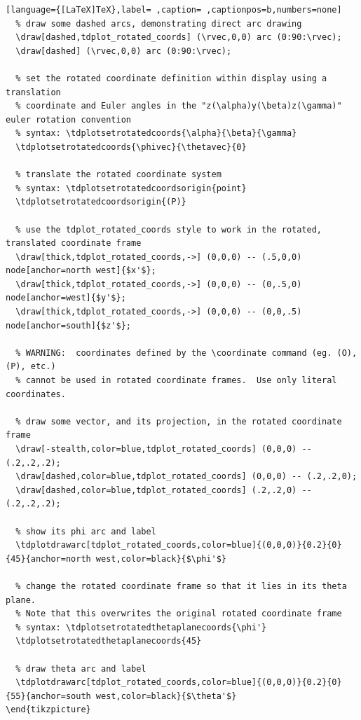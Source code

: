 \documentclass[a4paper,12pt]{article}
\begin{document}
\begin{lstlisting}[language={[LaTeX]TeX},label= ,caption= ,captionpos=b,numbers=none]
  % draw some dashed arcs, demonstrating direct arc drawing
  \draw[dashed,tdplot_rotated_coords] (\rvec,0,0) arc (0:90:\rvec);
  \draw[dashed] (\rvec,0,0) arc (0:90:\rvec);

  % set the rotated coordinate definition within display using a translation
  % coordinate and Euler angles in the "z(\alpha)y(\beta)z(\gamma)" euler rotation convention
  % syntax: \tdplotsetrotatedcoords{\alpha}{\beta}{\gamma}
  \tdplotsetrotatedcoords{\phivec}{\thetavec}{0}

  % translate the rotated coordinate system
  % syntax: \tdplotsetrotatedcoordsorigin{point}
  \tdplotsetrotatedcoordsorigin{(P)}

  % use the tdplot_rotated_coords style to work in the rotated, translated coordinate frame
  \draw[thick,tdplot_rotated_coords,->] (0,0,0) -- (.5,0,0) node[anchor=north west]{$x'$};
  \draw[thick,tdplot_rotated_coords,->] (0,0,0) -- (0,.5,0) node[anchor=west]{$y'$};
  \draw[thick,tdplot_rotated_coords,->] (0,0,0) -- (0,0,.5) node[anchor=south]{$z'$};

  % WARNING:  coordinates defined by the \coordinate command (eg. (O), (P), etc.)
  % cannot be used in rotated coordinate frames.  Use only literal coordinates.  

  % draw some vector, and its projection, in the rotated coordinate frame
  \draw[-stealth,color=blue,tdplot_rotated_coords] (0,0,0) -- (.2,.2,.2);
  \draw[dashed,color=blue,tdplot_rotated_coords] (0,0,0) -- (.2,.2,0);
  \draw[dashed,color=blue,tdplot_rotated_coords] (.2,.2,0) -- (.2,.2,.2);

  % show its phi arc and label
  \tdplotdrawarc[tdplot_rotated_coords,color=blue]{(0,0,0)}{0.2}{0}{45}{anchor=north west,color=black}{$\phi'$}

  % change the rotated coordinate frame so that it lies in its theta plane.
  % Note that this overwrites the original rotated coordinate frame
  % syntax: \tdplotsetrotatedthetaplanecoords{\phi'}
  \tdplotsetrotatedthetaplanecoords{45}

  % draw theta arc and label
  \tdplotdrawarc[tdplot_rotated_coords,color=blue]{(0,0,0)}{0.2}{0}{55}{anchor=south west,color=black}{$\theta'$}
\end{tikzpicture}
\end{lstlisting}

\\[0pt]
\end{document}
